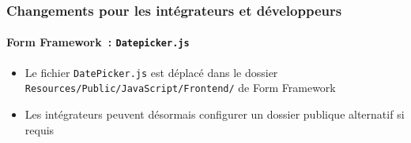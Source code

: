 %

\begin{frame}[fragile]
	\frametitle{Changements pour les intégrateurs et développeurs}
	\framesubtitle{Form Framework~: \texttt{Datepicker.js}}


	\begin{itemize}
		\item Le fichier \texttt{DatePicker.js} est déplacé dans le dossier
			\texttt{Resources/Public/JavaScript/Frontend/} de Form Framework
		\item Les intégrateurs peuvent désormais configurer un dossier publique alternatif si requis
	\end{itemize}

\end{frame}

